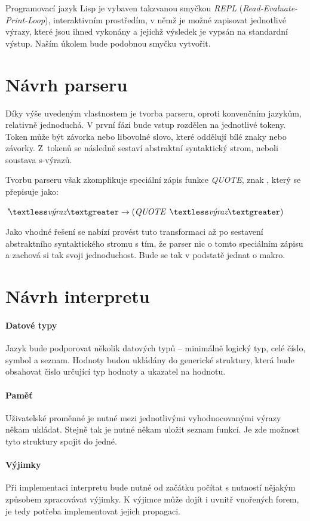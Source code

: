 \documentclass[12pt, a4paper]{report}
\newcommand{\lt}{\textless}
\newcommand{\gt}{\textgreater}
\begin{document}
Programovací jazyk Lisp je vybaven takzvanou smyčkou \emph{REPL} (\emph{Read-Evaluate-Print-Loop}), interaktivním prostředím, v němž je možné zapisovat jednotlivé výrazy, které jsou ihned vykonány a jejichž výsledek je vypsán na standardní výstup. Naším úkolem bude podobnou smyčku vytvořit.

\section{Návrh parseru}
Díky výše uvedeným vlastnostem je tvorba parseru, oproti konvenčním jazykům, relativně jednoduchá.
V první fázi bude vstup rozdělen na jednotlivé tokeny. Token může být závorka nebo libovolné slovo, které oddělují bílé znaky nebo závorky.
Z~tokenů se následně sestaví abstraktní syntaktický strom, neboli soustava s-výrazů.

Tvorbu parseru však zkomplikuje speciální zápis funkce \emph{QUOTE}, znak , který se přepisuje jako:\\
\centerline{$\emph{'}\lt\textit{výraz}\gt \rightarrow (\emph{QUOTE}$ $\lt\textit{výraz}\gt)$}

\vspace{5pt}
Jako vhodné řešení se nabízí provést tuto transformaci až po sestavení abstraktního syntaktického stromu s tím, že parser  nic o tomto speciálním zápisu a zachová si tak svoji jednoduchost. Bude se tak v podstatě jednat o makro.

\section{Návrh interpretu}

\paragraph{Datové typy}
Jazyk bude podporovat několik datových typů -- minimálně logický typ, celé číslo, symbol a seznam.
Hodnoty budou ukládány do generické struktury, která bude obsahovat číslo určující typ hodnoty a ukazatel na hodnotu.

\paragraph{Paměť}
Uživatelské proměnné je nutné mezi jednotlivými vyhodnocovanými výrazy někam ukládat. Stejně tak je nutné někam uložit seznam funkcí. Je zde možnost tyto struktury spojit do jedné.

\paragraph{Výjimky}
Při implementaci interpretu bude nutné od začátku počítat s nutností nějakým způsobem zpracovávat výjimky. K výjimce může dojít i uvnitř vnořených forem, je tedy potřeba implementovat jejich propagaci.
\end{document}
